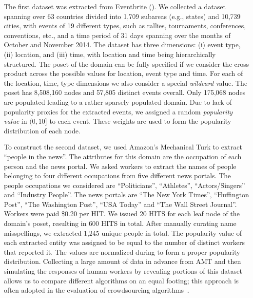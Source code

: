 The first dataset was extracted from Eventbrite (). We collected a dataset spanning over 63 countries divided into 1,709 subareas (e.g., states) and 10,739 cities, with events of 19 different types, such as rallies, tournaments, conferences, conventions, etc., and a time period of 31 days spanning over the months of October and November 2014. The dataset has three dimensions: (i) event type, (ii) location, and (iii) time, with location and time being hierarchically structured. The poset of the domain can be fully specified if we consider the cross product across the possible values for location, event type and time. For each of the location, time, type dimensions we also consider a special {\em wildcard} value. The poset has 8,508,160 nodes and 57,805 distinct events overall. Only 175,068 nodes are populated leading to a rather sparsely populated domain. Due to lack of popularity proxies for the extracted events, we assigned a random {\em popularity value} in $(0,10]$ to each event. These weights are used to form the popularity distribution of each node. 

To construct the second dataset, we used Amazon's Mechanical Turk to extract ``people in the news''. The attributes for this domain are the occupation of each person and the news portal. We asked workers to extract the names of people belonging to four different occupations from five different news portals. The people occupations we considered are ``Politicians'', ``Athletes'', ``Actors/Singers'' and ``Industry People''. The news portals are ``The New York Times'', ``Huffington Post'', ``The Washington Post'', ``USA  Today'' and ``The Wall Street Journal''. Workers were paid \$0.20 per HIT. We issued 20 HITS for each leaf node of the domain's poset, resulting in 600 HITS in total. After manually curating name misspellings, we extracted 1,245 unique people in total. The popularity value of each extracted entity was assigned to be equal to the number of distinct workers that reported it. The values are normalized during to form a proper popularity distribution. Collecting a large amount of data in advance from AMT and then simulating the responses of human workers by revealing portions of this dataset allows us to compare different algorithms on an equal footing; this approach is often adopted in the evaluation of crowdsourcing algorithms~\cite{marcus:2011, DBLP:journals/pvldb/ParameswaranBG0PW14,trushkowsky:2013}.

